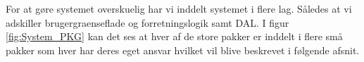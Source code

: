 
For at gøre systemet overskuelig har vi inddelt systemet i flere lag. Således at vi adskiller \Gls{brugergraenseflade} og \Gls{forretningslogik} samt \gls{DAL}. I figur \ref{fig:System_PKG} kan det ses at hver af de store pakker er inddelt i flere små pakker som hver har deres eget ansvar hvilket vil blive beskrevet i følgende afsnit.